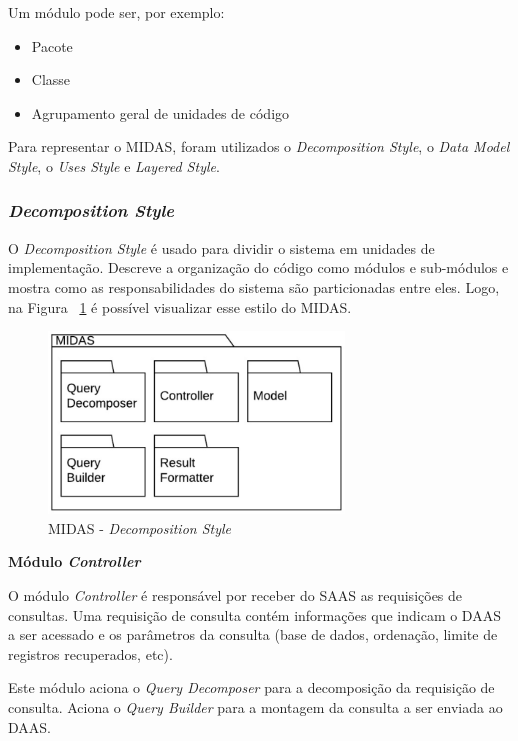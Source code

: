 \documentclass[11pt,a4paper]{article}
\begin{document}
Um módulo pode ser, por exemplo: 

\begin{itemize}
\item Pacote
\item Classe
\item Agrupamento geral de unidades de código
\end{itemize}

Para representar o MIDAS, foram utilizados o \textit{Decomposition Style}, o \textit{Data Model Style}, o \textit{Uses Style} e \textit{Layered Style}. 

\subsubsection{\textit{Decomposition Style}}

O \textit{Decomposition Style} é usado para dividir o sistema em unidades de implementação. Descreve a organização do código como módulos e sub-módulos e mostra como as responsabilidades do sistema são particionadas entre eles. Logo, na Figura ~\ref{decomposicao} é possível visualizar esse estilo do MIDAS.

\begin{figure} [h!]
  \centering
    \includegraphics[width=0.7\textwidth]{MIDAS_-_Estilo_Decomposicao}
  \caption{MIDAS - \textit{Decomposition Style}}
  \label{decomposicao}
\end{figure}

\textbf{Módulo \textit{Controller}}

O módulo \textit{Controller} é responsável por receber do SAAS as requisições de consultas. Uma requisição de consulta contém informações que indicam o DAAS a ser acessado e os parâmetros da consulta (base de dados, ordenação, limite de registros recuperados, etc). 

Este módulo aciona o \textit{Query Decomposer} para a decomposição da requisição de consulta. Aciona o \textit{Query Builder} para a montagem da consulta a ser enviada ao DAAS. 
\end{document}
